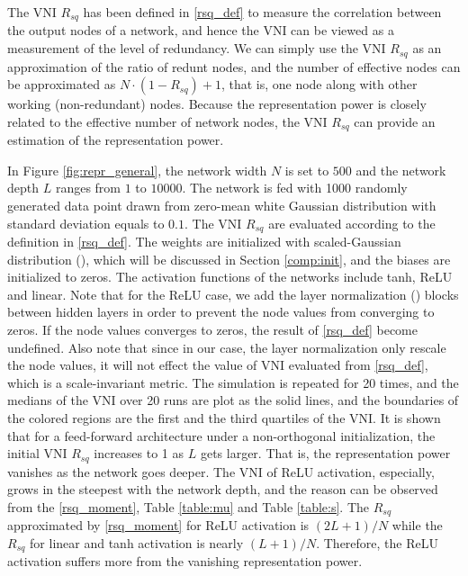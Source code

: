 The VNI $R_{sq}$ has been defined in \eqref{rsq_def} to measure the correlation between the output nodes of
a network, and hence the VNI can be viewed as a measurement of the level of redundancy.
We can simply use the VNI $R_{sq}$ as an approximation of the ratio of redunt nodes, and the number of 
effective nodes can be approximated as $N\cdot(1-R_{sq})+1$, that is, one node along with other working
(non-redundant) nodes.
Because the representation power is closely related to the effective number of network nodes, the VNI
$R_{sq}$ can provide an estimation of the representation power.
 
In Figure \ref{fig:repr_general}, the network width $N$ is set to $500$ and the network depth
$L$ ranges from $1$ to $10000$. The network is fed with 1000 randomly generated data point
drawn from zero-mean white Gaussian distribution with standard deviation equals to $0.1$.
The VNI $R_{sq}$ are evaluated according to the definition in \eqref{rsq_def}.
The weights are initialized with scaled-Gaussian distribution (\cite{xavier, he}), which
will be discussed in Section \ref{comp:init}, and the biases are initialized to zeros.
The activation functions of the networks include tanh, ReLU and linear. Note that for the
ReLU case, we add the layer normalization (\cite{layer_norm}) blocks between hidden layers
in order to prevent the node values from converging to zeros. If the node values converges
to zeros, the result of \eqref{rsq_def} become undefined.
Also note that since in our case, the layer
normalization only rescale the node values, it will not effect the value of VNI evaluated
from \eqref{rsq_def}, which is a scale-invariant metric.
The simulation is repeated for 20 times, and the medians of the VNI over 20 runs are plot as
the solid lines, and the boundaries of the colored regions are the first and the third
quartiles of the VNI. It is shown that for a feed-forward architecture under a non-orthogonal
initialization, the initial VNI $R_{sq}$ increases to 1 as $L$ gets larger. That is,
the representation power vanishes as the network goes deeper. The VNI of ReLU activation,
especially, grows in the steepest with the network depth, and the reason can be observed from
the \eqref{rsq_moment}, Table \ref{table:mu} and Table \ref{table:s}. The $R_{sq}$ 
approximated by \eqref{rsq_moment} for ReLU activation is $(2L+1)/N$ while the $R_{sq}$
for linear and tanh activation is nearly $(L+1)/N$.
Therefore, the ReLU activation suffers more from the vanishing representation power.


